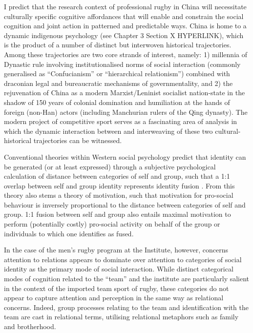   I predict that the research context of professional rugby in China will necessitate culturally specific cognitive affordances that will enable and constrain the social cognition and joint action in patterned and predictable ways.  China is home to a dynamic indigenous psychology (see Chapter 3 Section X HYPERLINK), which is the product of a number of distinct but interwoven historical trajectories.  Among these trajectories are two core strands of interest, namely: 1) millennia of Dynastic rule involving institutionalised norms of social interaction (commonly generalised as ``Confucianism'' or ``hierarchical relationism'') combined with draconian legal and bureaucratic mechanisms of governmentality, and 2) the rejuvenation of China as a modern Marxist/Leninist socialist nation-state in the shadow of 150 years of colonial domination and humiliation at the hands of foreign (non-Han) actors (including Manchurian rulers of the Qing dynasty).  The modern project of competitive sport serves as a fascinating area of analysis in which the dynamic interaction between and interweaving of these two cultural-historical trajectories can be witnessed.

  Conventional theories within Western social psychology predict that identity can be generated (or at least expressed) through a subjective psychological calculation of distance between categories of self and group, such that a 1:1 overlap between self and group identity represents identity fusion \citep{Swann2009}.  From this theory also stems a theory of motivation, such that motivation for pro-social behaviour is inversely proportional to the distance between categories of self and group. 1:1 fusion between self and group also entails maximal motivation to perform (potentially costly) pro-social activity on behalf of the group or individuals to which one identifies as fused.

  In the case of the men's rugby program at the Institute, however, concerns attention to relations appears to dominate over attention to categories of social identity as the primary mode of social interaction.  While distinct categorical modes of cognition related to the ``team'' and the institute are particularly salient in the context of the imported team sport of rugby, these categories do not appear to capture attention and perception in the same way as relational concerns.  Indeed, group processes relating to the team and identification with the team are cast in relational terms, utilising relational metaphors such as family and brotherhood.

